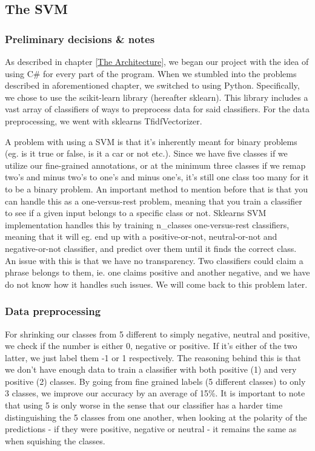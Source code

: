 \subsection{The SVM}
\subsubsection{Preliminary decisions \& notes} \label{svmdecisions}
As described in chapter \ref{The Architecture}, we began our project with the idea of using C\# for every part of the program. When we stumbled into the problems described in aforementioned chapter, we switched to using Python. Specifically, we chose to use the scikit-learn library (hereafter sklearn). This library includes a vast array of classifiers of ways to preprocess data for said classifiers. For the data preprocessing, we went with sklearns TfidfVectorizer\cite{tfidf}.

A problem with using a SVM is that it’s inherently meant for binary problems (eg. is it true or false, is it a car or not etc.).
Since we have five classes if we utilize our fine-grained annotations, or at the minimum three classes if we remap two's and minus two's to one's and minus one's, it’s still one class too many for it to be a binary problem.
An important method to mention before that is that you can handle this as a one-versus-rest problem, meaning that you train a classifier to see if a given input belongs to a specific class or not.
Sklearns SVM implementation handles this by training n\_classes one-versus-rest classifiers, meaning that it will eg. end up with a positive-or-not, neutral-or-not and negative-or-not classifier, and predict over them until it finds the correct class.
An issue with this is that we have no transparency. Two classifiers could claim a phrase belongs to them, ie. one claims positive and another negative, and we have do not know how it handles such issues. We will come back to this problem later.

\subsubsection{Data preprocessing}
For shrinking our classes from 5 different to simply negative, neutral and positive, we check if the number is either 0, negative or positive. If it’s either of the two latter, we just label them -1 or 1 respectively.
The reasoning behind this is that we don’t have enough data to train a classifier with both positive (1) and very positive (2) classes. By going from fine grained labels (5 different classes) to only 3 classes, we improve our accuracy by an average of 15\%. It is important to note that using 5 is only worse in the sense that our classifier has a harder time distinguishing the 5 classes from one another, when looking at the polarity of the predictions - if they were positive, negative or neutral - it remains the same as when squishing the classes.

